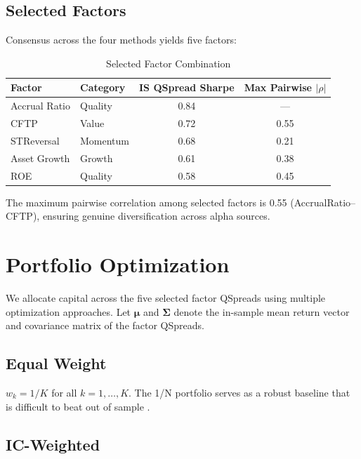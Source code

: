 \documentclass[12pt,a4paper]{article}
\begin{document}
\subsection{Selected Factors}

Consensus across the four methods yields five factors:

\begin{table}[H]
\centering
\caption{Selected Factor Combination}
\label{tab:selected}
\begin{tabular}{llcc}
\toprule
\textbf{Factor} & \textbf{Category} & \textbf{IS QSpread Sharpe} & \textbf{Max Pairwise $|\rho|$} \\
\midrule
Accrual Ratio & Quality & 0.84 & --- \\
CFTP & Value & 0.72 & 0.55 \\
STReversal & Momentum & 0.68 & 0.21 \\
Asset Growth & Growth & 0.61 & 0.38 \\
ROE & Quality & 0.58 & 0.45 \\
\bottomrule
\end{tabular}
\end{table}

The maximum pairwise correlation among selected factors is 0.55 (AccrualRatio--CFTP), ensuring genuine diversification across alpha sources.

\section{Portfolio Optimization}
\label{sec:optimization}

We allocate capital across the five selected factor QSpreads using multiple optimization approaches. Let $\boldsymbol{\mu}$ and $\boldsymbol{\Sigma}$ denote the in-sample mean return vector and covariance matrix of the factor QSpreads.

\subsection{Equal Weight}

$w_k = 1/K$ for all $k = 1, \ldots, K$. The 1/N portfolio serves as a robust baseline that is difficult to beat out of sample \citep{demiguel2009optimal}.

\subsection{IC-Weighted}
\end{document}

